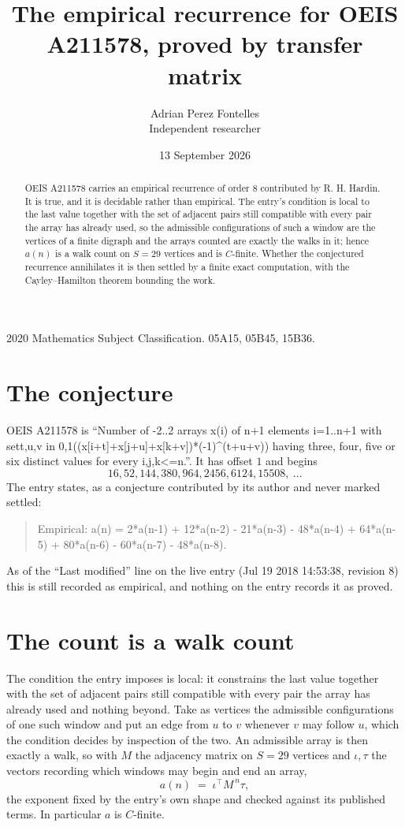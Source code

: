 \documentclass[11pt,a4paper]{article}
\title{The empirical recurrence for OEIS A211578, proved by transfer matrix}
\author{Adrian Perez Fontelles\\ \small Independent researcher}
\date{13 September 2026}
\theoremstyle{plain}
\theoremstyle{definition}
\begin{document}
\maketitle

\begin{abstract}
OEIS A211578 carries an empirical recurrence of order $8$ contributed by R. H. Hardin. It is
true, and it is decidable rather than empirical. The entry's condition is local to the last value together with the set of adjacent pairs still compatible with every pair the array has already used, so
the admissible configurations of such a window are the vertices of a finite digraph and the
arrays counted are exactly the walks in it; hence $a(n)$ is a walk count on $S=29$ vertices
and is $C$-finite. Whether the conjectured recurrence annihilates it is then settled by a
finite exact computation, with the Cayley--Hamilton theorem bounding the work.
\end{abstract}

\noindent\small 2020 Mathematics Subject Classification. 05A15, 05B45, 15B36.\normalsize

\section{The conjecture}

OEIS A211578 is ``Number of -2..2 arrays x(i) of n+1 elements i=1..n+1 with set{t,u,v in 0,1}((x[i+t]+x[j+u]+x[k+v])*(-1)\^{}(t+u+v)) having three, four, five or six distinct values for every i,j,k<=n.''. It has offset $1$ and begins
\[
16, 52, 144, 380, 964, 2456, 6124, 15508,\ \dots
\]
The entry states, as a conjecture contributed by its author and never marked settled:
\begin{quote}
Empirical: a(n) = 2*a(n-1) + 12*a(n-2) - 21*a(n-3) - 48*a(n-4) + 64*a(n-5) + 80*a(n-6) - 60*a(n-7) - 48*a(n-8).
\end{quote}
As of the ``Last modified'' line on the live entry (Jul 19 2018 14:53:38, revision 8) this is still
recorded as empirical, and nothing on the entry records it as proved.

\section{The count is a walk count}

The condition the entry imposes is local: it constrains the last value together with the set of adjacent pairs still compatible with every pair the array has already used and nothing beyond. Take as
vertices the admissible configurations of one such window and put an edge from $u$ to $v$
whenever $v$ may follow $u$, which the condition decides by inspection of the two. An
admissible array is then exactly a walk, so with $M$ the adjacency matrix on $S=29$ vertices
and $\iota,\tau$ the vectors recording which windows may begin and end an array,
\[
a(n)\;=\;\iota^{\!\top}M^{\,n}\tau ,
\]
the exponent fixed by the entry's own shape and checked against its published terms. In
particular $a$ is $C$-finite.
\end{document}
